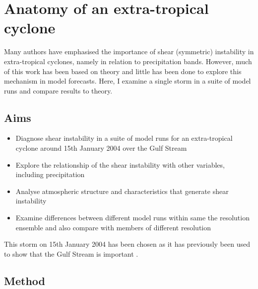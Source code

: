 \chapter{Anatomy of an extra-tropical cyclone}\label{Ch4}

\graphicspath{{Chapter3/Figs/}}


Many authors have emphasised the importance of shear (symmetric) instability in extra-tropical cyclones, namely in relation to precipitation bands. However, much of this work has been based on theory and little has been done to explore this mechanism in model forecasts. Here, I examine a single storm in a suite of model runs and compare results to theory.

\section{Aims}
\begin{itemize}
	\item Diagnose shear instability in a suite of model runs for an extra-tropical cyclone around 15th January 2004 over the Gulf Stream
	\item Explore the relationship of the shear instability with other variables, including precipitation
	\item Analyse atmospheric structure and characteristics that generate shear instability
	\item Examine differences between different model runs within same the resolution ensemble and also compare with members of different resolution
\end{itemize}

This storm on 15th January 2004 has been chosen as it has previously been used to show that the Gulf Stream is important \citep{sheldon2017warm}. 



\section {Method}  \label{method}

